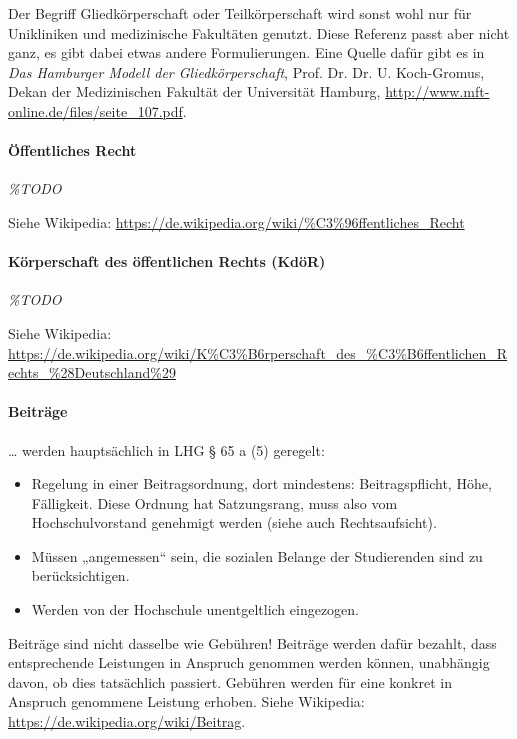 \documentclass[
10pt,
a4paper,
twoside,								%
titlepage=false,							%
draft=false								%
]{scrartcl}
\begin{document}
Der Begriff Gliedkörperschaft oder Teilkörperschaft wird sonst wohl nur für Unikliniken und medizinische Fakultäten genutzt. Diese Referenz passt aber nicht ganz, es gibt dabei etwas andere Formulierungen. Eine Quelle dafür gibt es in \emph{Das Hamburger Modell der Gliedkörperschaft}, Prof. Dr. Dr. U. Koch-Gromus, Dekan der Medizinischen Fakultät der Universität Hamburg, \url{http://www.mft-online.de/files/seite_107.pdf}.



\paragraph{Öffentliches Recht}

\textit{\%TODO}

Siehe Wikipedia: \url{https://de.wikipedia.org/wiki/%C3%96ffentliches_Recht}



\paragraph{Körperschaft des öffentlichen Rechts (KdöR)}

\textit{\%TODO}

Siehe Wikipedia: \sloppy \url{https://de.wikipedia.org/wiki/K%C3%B6rperschaft_des_%C3%B6ffentlichen_Rechts_%28Deutschland%29}



\paragraph{Beiträge}

… werden hauptsächlich in LHG § 65 a (5) geregelt:
\begin{itemize}
	\item Regelung in einer Beitragsordnung, dort mindestens: Beitragspflicht, Höhe, Fälligkeit. Diese Ordnung hat Satzungsrang, muss also vom Hochschulvorstand genehmigt werden (siehe auch Rechtsaufsicht).
	\item Müssen „angemessen“ sein, die sozialen Belange der Studierenden sind zu berücksichtigen.
	\item Werden von der Hochschule unentgeltlich eingezogen.
\end{itemize}
Beiträge sind nicht dasselbe wie Gebühren! Beiträge werden dafür bezahlt, dass entsprechende Leistungen in Anspruch genommen werden können, unabhängig davon, ob dies tatsächlich passiert. Gebühren werden für eine konkret in Anspruch genommene Leistung erhoben. Siehe Wikipedia: \url{https://de.wikipedia.org/wiki/Beitrag}.
\end{document}
